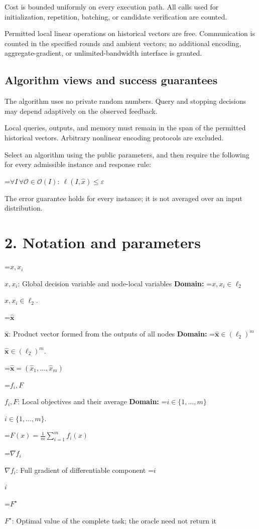 \documentclass[10pt,a4paper]{article}
\newcommand{\AtlasMath}[1]{\par\begingroup\centering\setbox0=\hbox{$\displaystyle #1$}\ifdim\wd0>1.4\linewidth\typeout{ATLAS WIDE FORMULA: \the\wd0}\fi\ifdim\wd0>\linewidth\resizebox{\linewidth}{!}{\box0}\else\box0\fi\par\endgroup}
\newcommand{\AtlasInlineMath}[1]{\begingroup\setbox0=\hbox{$#1$}\ifdim\wd0>.4\linewidth\endgroup\AtlasMath{#1}\else\endgroup$#1$\fi}
\begin{document}
Cost is bounded uniformly on every execution path. All calls used for initialization, repetition, batching, or candidate verification are counted.

Permitted local linear operations on historical vectors are free. Communication is counted in the specified rounds and ambient vectors; no additional encoding, aggregate-gradient, or unlimited-bandwidth interface is granted.

\subsection{Algorithm views and success guarantees}
The algorithm uses no private random numbers. Query and stopping decisions may depend adaptively on the observed feedback.

Local queries, outputs, and memory must remain in the span of the permitted historical vectors. Arbitrary nonlinear encoding protocols are excluded.

Select an algorithm using the public parameters, and then require the following for every admissible instance and response rule:


\AtlasMath{\forall I\,\forall\mathcal{O}\in\mathcal{O}(I):\ \ell(I,\widehat{x})\le\varepsilon}


The error guarantee holds for every instance; it is not averaged over an input distribution.

\section{2. Notation and parameters}
\AtlasInlineMath{x,x_i}: Global decision variable and node-local variables \textbf{Domain:} \AtlasInlineMath{x,x_i\in \ell_2}.

\AtlasInlineMath{\widehat{\boldsymbol x}}: Product vector formed from the outputs of all nodes \textbf{Domain:} \AtlasInlineMath{\widehat{\boldsymbol x}\in (\ell_2)^m}.


\AtlasMath{\widehat{\boldsymbol x}=(\widehat{x}_1,\ldots,\widehat{x}_m)}


\AtlasInlineMath{f_i,F}: Local objectives and their average \textbf{Domain:} \AtlasInlineMath{i\in\{1,\ldots,m\}}.


\AtlasMath{F(x)=\frac1m\sum_{i=1}^m f_i(x)}


\AtlasInlineMath{\nabla f_i}: Full gradient of differentiable component \AtlasInlineMath{i}

\AtlasInlineMath{F^\star}: Optimal value of the complete task; the oracle need not return it
\end{document}
